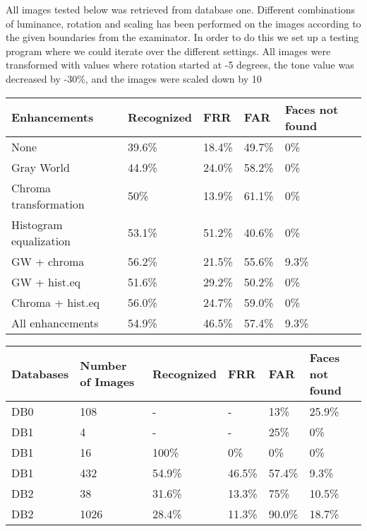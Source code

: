 All images tested below was retrieved from database one. Different combinations of luminance, rotation and scaling has been performed on the images according to the given boundaries from the examinator. In order to do this we set up a testing program where we could iterate over the different settings. All images were transformed with values where rotation started at -5 degrees, the tone value was decreased by -30\%, and the images were scaled down by 10%


\begin{center}
    \begin{tabular}{ | l | l | l | l | p{15mm} |}
    \hline
    \textbf{Enhancements} & \textbf{Recognized} & \textbf{FRR} & \textbf{FAR} & \textbf{Faces not found} \\ \hline
    None & 39.6\% & 18.4\% & 49.7\% & 0\%\\
    \hline
    Gray World & 44.9\% & 24.0\% & 58.2\% & 0\% \\
    \hline
    Chroma transformation & 50\% & 13.9\% & 61.1\% & 0\% \\
    \hline
    Histogram equalization & 53.1\% & 51.2\% & 40.6\% & 0\% \\
    \hline
    GW + chroma & 56.2\% & 21.5\% & 55.6\% & 9.3\% \\
    \hline
    GW + hist.eq & 51.6\% & 29.2\% & 50.2\% & 0\% \\
    \hline
    Chroma + hist.eq & 56.0\% & 24.7\% & 59.0\% & 0\% \\
    \hline
    All enhancements & 54.9\% & 46.5\% & 57.4\% & 9.3\% \\
    \hline

    \end{tabular}
\end{center}

\begin{center}
    \begin{tabular}{ | l | l | l | l | l | p{15mm} |}
    \hline
    \textbf{Databases} & \textbf{Number of Images} & \textbf{Recognized} & \textbf{FRR} & \textbf{FAR} & \textbf{Faces not found} \\ \hline
    DB0 & 108 & - & - & 13\% & 25.9\% \\
    \hline
    DB1 & 4 & - & - & 25\% & 0\% \\
    \hline
    DB1 & 16 & 100\% & 0\% & 0\% & 0\% \\
    \hline
    DB1 & 432 & 54.9\% & 46.5\% & 57.4\% & 9.3\% \\
    \hline
    DB2 & 38 & 31.6\% & 13.3\% & 75\% & 10.5\% \\
    \hline
    DB2 & 1026 & 28.4\% & 11.3\% & 90.0\% & 18.7\% \\
    \hline

    \end{tabular}
\end{center}


